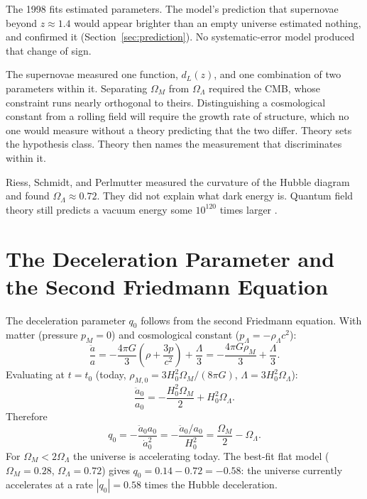 \documentclass[12pt]{article}
\begin{document}
The 1998 fits estimated parameters.  The model's prediction that supernovae
beyond $z \approx 1.4$ would appear brighter than an empty universe estimated
nothing, and \citet{Riess2004} confirmed it
(Section~\ref{sec:prediction}).  No systematic-error model produced that
change of sign.

The supernovae measured one function, $d_L(z)$, and one combination of two
parameters within it.  Separating $\Omega_M$ from $\Omega_\Lambda$ required the
CMB, whose constraint runs nearly orthogonal to theirs.  Distinguishing a
cosmological constant from a rolling field will require the growth rate of
structure, which no one would measure without a theory predicting that the two
differ.  Theory sets the hypothesis class.  Theory then names the measurement
that discriminates within it.

Riess, Schmidt, and Perlmutter measured the curvature of the Hubble diagram
and found $\Omega_\Lambda \approx 0.72$.  They did not explain what dark
energy is.  Quantum field theory still predicts a vacuum energy some
$10^{120}$ times larger \citep{Weinberg1989}.

\appendix

\section{The Deceleration Parameter and the Second Friedmann Equation}
\label{app:q0}

The deceleration parameter $q_0$ follows from the second Friedmann equation.
With matter (pressure $p_M = 0$) and cosmological constant
($p_\Lambda = -\rho_\Lambda c^2$):
\begin{equation}\label{eq:friedmann2}
  \frac{\ddot a}{a} = -\frac{4\pi G}{3}\left(\rho + \frac{3p}{c^2}\right)
  + \frac{\Lambda}{3}
  = -\frac{4\pi G \rho_M}{3} + \frac{\Lambda}{3}.
\end{equation}
Evaluating at $t = t_0$ (today, $\rho_{M,0} = 3H_0^2\Omega_M/(8\pi G)$,
$\Lambda = 3H_0^2\Omega_\Lambda$):
\begin{equation}
  \frac{\ddot a_0}{a_0} = -\frac{H_0^2\Omega_M}{2} + H_0^2\Omega_\Lambda.
\end{equation}
Therefore
\begin{equation}\label{eq:q0_derive}
  q_0 = -\frac{\ddot a_0 a_0}{\dot a_0^2}
  = -\frac{\ddot a_0/a_0}{H_0^2}
  = \frac{\Omega_M}{2} - \Omega_\Lambda.
\end{equation}
For $\Omega_M < 2\Omega_\Lambda$ the universe is accelerating today.
The best-fit flat model ($\Omega_M = 0.28$, $\Omega_\Lambda = 0.72$)
gives $q_0 = 0.14 - 0.72 = -0.58$: the universe currently accelerates
at a rate $|q_0| = 0.58$ times the Hubble deceleration.
\end{document}
